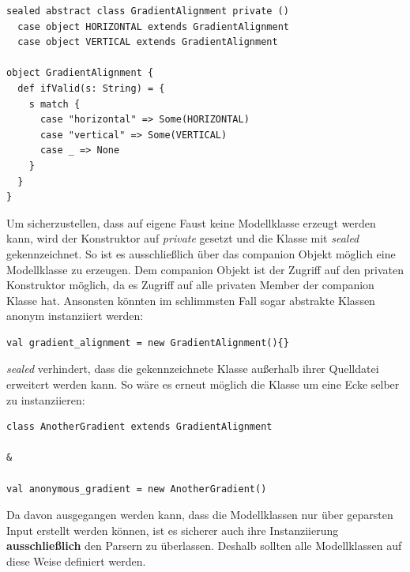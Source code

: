 \begin{lstlisting}[style=scala]
sealed abstract class GradientAlignment private ()
  case object HORIZONTAL extends GradientAlignment
  case object VERTICAL extends GradientAlignment

object GradientAlignment {
  def ifValid(s: String) = {
    s match {
      case "horizontal" => Some(HORIZONTAL)
      case "vertical" => Some(VERTICAL)
      case _ => None
    }
  }
}
\end{lstlisting} Um sicherzustellen, dass auf eigene Faust keine Modellklasse erzeugt werden kann, wird der Konstruktor auf \textit{private} gesetzt und die Klasse mit \textit{sealed} gekennzeichnet. So ist es ausschließlich über das companion Objekt möglich eine Modellklasse zu erzeugen. Dem companion Objekt ist der Zugriff auf den privaten Konstruktor möglich, da es Zugriff auf alle privaten Member der companion Klasse hat. Ansonsten könnten im schlimmsten Fall sogar abstrakte Klassen anonym instanziiert werden:
\begin{lstlisting}[style=scala, aboveskip=0pt]
val gradient_alignment = new GradientAlignment(){}
\end{lstlisting}
\textit{sealed} verhindert, dass die gekennzeichnete Klasse außerhalb ihrer Quelldatei erweitert werden kann. So wäre es erneut möglich die Klasse um eine Ecke selber zu instanziieren:
\begin{lstlisting}[style=scala]
class AnotherGradient extends GradientAlignment

& 
 
val anonymous_gradient = new AnotherGradient()
\end{lstlisting}
Da davon ausgegangen werden kann, dass die Modellklassen nur über geparsten Input erstellt werden können, ist es sicherer auch ihre Instanziierung \textbf{ausschließlich} den Parsern zu überlassen. Deshalb sollten alle Modellklassen auf diese Weise definiert werden.

